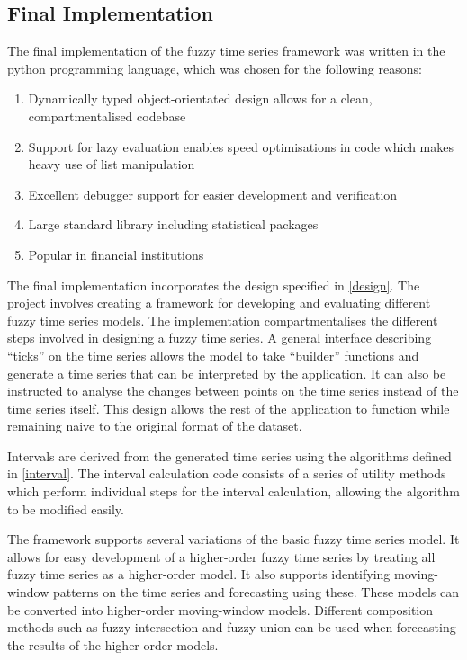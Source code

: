 \documentclass[12pt, oneside, a4paper]{article}
\theoremstyle{definition}
\begin{document}
\subsection{Final Implementation}

The final implementation of the fuzzy time series framework was written in the python programming language, which was chosen for the following reasons:

\begin{enumerate}[label=\roman*]
\label{python}
\item Dynamically typed object-orientated design allows for a clean, compartmentalised codebase
\item Support for lazy evaluation enables speed optimisations in code which makes heavy use of list manipulation
\item Excellent debugger support for easier development and verification
\item Large standard library including statistical packages
\item Popular in financial institutions
\end{enumerate}

The final implementation incorporates the design specified in \cref{design}. The project involves creating a framework for developing and evaluating different fuzzy time series models. The implementation compartmentalises the different steps involved in designing a fuzzy time series. A general interface describing ``ticks'' on the time series allows the model to take ``builder'' functions and generate a time series that can be interpreted by the application. It can also be instructed to analyse the changes between points on the time series instead of the time series itself. This design allows the rest of the application to function while remaining naive to the original format of the dataset.

Intervals are derived from the generated time series using the algorithms defined in \cref{interval}. The interval calculation code consists of a series of utility methods which perform individual steps for the interval calculation, allowing the algorithm to be modified easily.

The framework supports several variations of the basic fuzzy time series model. It allows for easy development of a higher-order fuzzy time series by treating all fuzzy time series as a higher-order model. It also supports identifying moving-window patterns on the time series and forecasting using these. These models can be converted into higher-order moving-window models. Different composition methods such as fuzzy intersection and fuzzy union can be used when forecasting the results of the higher-order models.
\end{document}
